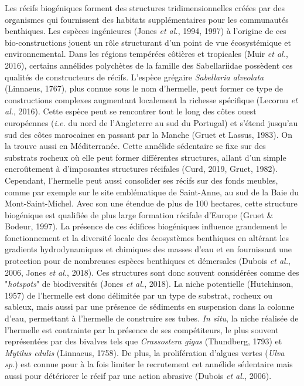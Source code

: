\documentclass[12pt]{report}
\begin{document}
Les récifs biogéniques forment des structures tridimensionnelles créées par des organismes qui fournissent des habitats supplémentaires pour les communautés benthiques. Les espèces ingénieures (Jones \textit{et al.}, 1994, 1997) à l’origine de ces bio-constructions jouent un rôle structurant d’un point de vue écosystémique et environnemental. Dans les régions tempérées côtières et tropicales (Muir \textit{et al.}, 2016), certains annélides polychètes de la famille des Sabellariidae possèdent ces qualités de constructeurs de récifs. L’espèce grégaire \textit{Sabellaria alveolata} (Linnaeus, 1767), plus connue sous le nom d’hermelle, peut former ce type de constructions complexes augmentant localement la richesse spécifique (Lecornu \textit{et al.}, 2016). Cette espèce peut se rencontrer tout le long des côtes ouest européennes (\textit{i.e.} du nord de l’Angleterre au sud du Portugal) et s’étend jusqu’au sud des côtes marocaines en passant par la Manche (Gruet et Lassus, 1983). On la trouve aussi en Méditerranée.
\newline \newline
Cette annélide sédentaire se fixe sur des substrats rocheux où elle peut former différentes structures, allant d’un simple encroûtement à d’imposantes structures récifales (Curd, 2019, Gruet, 1982). Cependant, l'hermelle peut aussi consolider ses récifs sur des fonds meubles, comme par exemple sur le site emblématique de Saint-Anne,  au sud de la Baie du Mont-Saint-Michel. Avec son une étendue de plus de 100 hectares, cette structure biogénique est qualifiée de plus large formation récifale d’Europe (Gruet \& Bodeur, 1997). La présence de ces édifices biogéniques influence grandement le fonctionnement et la diversité locale des écosystèmes benthiques en altérant les gradients hydrodynamiques et chimiques des masses d’eau et en fournissant une protection pour de nombreuses espèces benthiques et démersales (Dubois \textit{et al.}, 2006, Jones \textit{et al.}, 2018). Ces structures sont donc souvent considérées comme des "\textit{hotspots}" de biodiversités (Jones \textit{et al.}, 2018). 
\newline \newline
La niche potentielle (Hutchinson, 1957) de l'hermelle est donc délimitée par un type de substrat, rocheux ou sableux, mais aussi par une présence de sédiments en suspension dans la colonne d'eau, permettant à l'hermelle de construire ses tubes. \textit{In situ}, la niche réalisée de l'hermelle est contrainte par la présence de ses compétiteurs, le plus souvent représentées par des bivalves tels que \textit{Crassostera gigas} (Thundberg, 1793) et \textit{Mytilus edulis} (Linnaeus, 1758). De plus, la prolifération d'algues vertes (\textit{Ulva sp.}) est connue pour à la fois limiter le recrutement cet annélide sédentaire mais aussi pour détériorer le récif par une action abrasive (Dubois \textit{et al.}, 2006). 
\end{document}
